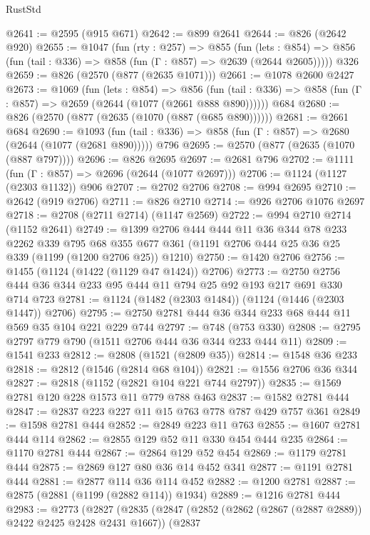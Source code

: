 \begin{lexlean}{RustStd}
\begin{coremodule}
@2641 := @2595 (@915 @671)
@2642 := @899 @2641
@2644 := @826 (@2642 @920)
@2655 := @1047
    (fun (rty : @257) =>
    @855
      (fun (lets : @854) =>
      @856 (fun (tail : @336) => @858 (fun (Γ : @857) => @2639 (@2644 @2605)))))
    @326
@2659 := @826 (@2570 (@877 (@2635 @1071)))
@2661 := @1078 @2600 @2427
@2673 := @1069
    (fun (lets : @854) =>
    @856 (fun (tail : @336) => @858 (fun (Γ : @857) => @2659 (@2644 (@1077 (@2661 @888 @890))))))
    @684
@2680 := @826 (@2570 (@877 (@2635 (@1070 (@887 (@685 @890))))))
@2681 := @2661 @684
@2690 := @1093
    (fun (tail : @336) => @858 (fun (Γ : @857) => @2680 (@2644 (@1077 (@2681 @890)))))
    @796
@2695 := @2570 (@877 (@2635 (@1070 (@887 @797))))
@2696 := @826 @2695
@2697 := @2681 @796
@2702 := @1111 (fun (Γ : @857) => @2696 (@2644 (@1077 @2697)))
@2706 := @1124 (@1127 (@2303 @1132)) @906
@2707 := @2702 @2706
@2708 := @994 @2695
@2710 := @2642 (@919 @2706)
@2711 := @826 @2710
@2714 := @926 @2706 @1076 @2697
@2718 := @2708 (@2711 @2714) (@1147 @2569)
@2722 := @994 @2710 @2714 (@1152 @2641)
@2749 := @1399
    @2706
    @444
    @444
    @11
    @36
    @344
    @78
    @233
    @2262
    @339
    @795
    @68
    @355
    @677
    @361
    (@1191 @2706 @444 @25 @36 @25 @339 (@1199 (@1200 @2706 @25)) @1210)
@2750 := @1420 @2706
@2756 := @1455 (@1124 (@1422 (@1129 @47 @1424)) @2706)
@2773 := @2750 @2756 @444 @36 @344 @233 @95 @444 @11 @794 @25 @92 @193 @217 @691 @330 @714 @723
@2781 := @1124 (@1482 (@2303 @1484)) (@1124 (@1446 (@2303 @1447)) @2706)
@2795 := @2750 @2781 @444 @36 @344 @233 @68 @444 @11 @569 @35 @104 @221 @229 @744
@2797 := @748 (@753 @330)
@2808 := @2795 @2797 @779 @790 (@1511 @2706 @444 @36 @344 @233 @444 @11)
@2809 := @1541 @233
@2812 := @2808 (@1521 (@2809 @35))
@2814 := @1548 @36 @233
@2818 := @2812 (@1546 (@2814 @68 @104))
@2821 := @1556 @2706 @36 @344
@2827 := @2818 (@1152 (@2821 @104 @221 @744 @2797))
@2835 := @1569 @2781 @120 @228 @1573 @11 @779 @788 @463
@2837 := @1582 @2781 @444
@2847 := @2837 @223 @227 @11 @15 @763 @778 @787 @429 @757 @361
@2849 := @1598 @2781 @444
@2852 := @2849 @223 @11 @763
@2855 := @1607 @2781 @444 @114
@2862 := @2855 @129 @52 @11 @330 @454 @444 @235
@2864 := @1170 @2781 @444
@2867 := @2864 @129 @52 @454
@2869 := @1179 @2781 @444
@2875 := @2869 @127 @80 @36 @14 @452 @341
@2877 := @1191 @2781 @444
@2881 := @2877 @114 @36 @114 @452
@2882 := @1200 @2781
@2887 := @2875 (@2881 (@1199 (@2882 @114)) @1934)
@2889 := @1216 @2781 @444
@2983 := @2773
    (@2827
      (@2835
        (@2847
          (@2852 (@2862 (@2867 (@2887 @2889)) @2422 @2425 @2428 @2431 @1667))
          (@2837

\end{coremodule}
\end{lexlean}
